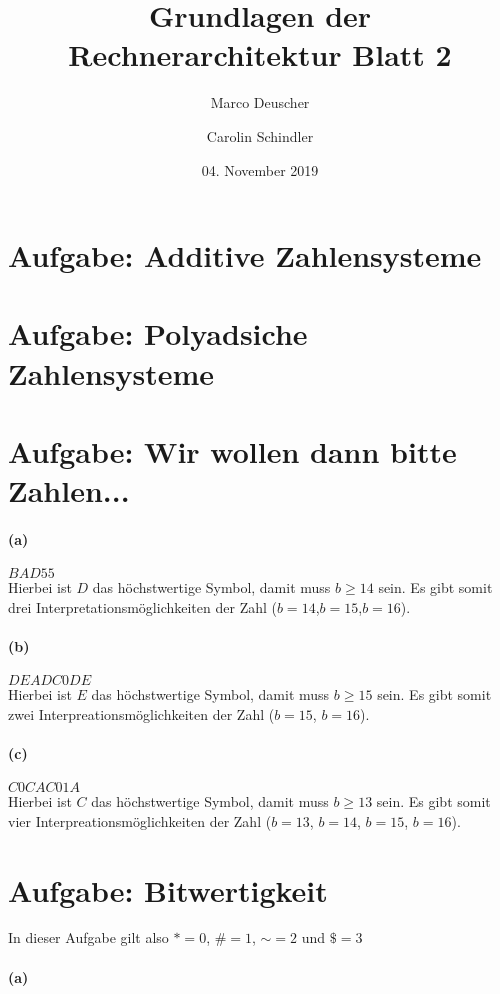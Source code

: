 \documentclass[a4paper]{article}
\title{Grundlagen der Rechnerarchitektur Blatt 2}
\author{Marco Deuscher \and Carolin Schindler}
\date{04. November 2019}
\begin{document}
\maketitle

\section{Aufgabe: Additive Zahlensysteme}

\section{Aufgabe: Polyadsiche Zahlensysteme}


\section{Aufgabe: Wir wollen dann bitte Zahlen...}
\paragraph{(a)}
$BAD55$\\
Hierbei ist $D$ das höchstwertige Symbol, damit muss $b\geq 14$ sein. Es gibt somit drei Interpretationsmöglichkeiten der Zahl ($b=14$,$b=15$,$b=16$).

\paragraph{(b)}
$DEADC0DE$\\
Hierbei ist $E$ das höchstwertige Symbol, damit muss $b\geq 15$ sein. Es gibt somit zwei Interpreationsmöglichkeiten der Zahl ($b=15$, $b=16$).

\paragraph{(c)}
$C0CAC01A$\\
Hierbei ist $C$ das höchstwertige Symbol, damit muss $b\geq	13$ sein. Es gibt somit vier Interpreationsmöglichkeiten der Zahl ($b=13$, $b=14$, $b=15$, $b=16$).

\section{Aufgabe: Bitwertigkeit}
In dieser Aufgabe gilt also $*=0$, $\#=1$, $\sim=2$ und $\$=3$

\paragraph{(a)}
\end{document}
